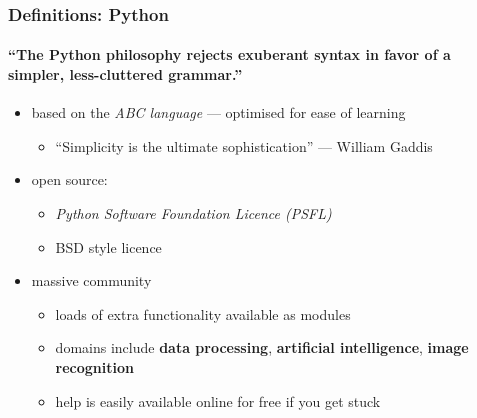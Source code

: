 \documentclass{beamer}
\begin{document}
    \begin{frame}
	    \frametitle{Definitions: Python}
	    \framesubtitle{``The Python philosophy rejects exuberant syntax in favor of a simpler, less-cluttered grammar.''}
	    \begin{itemize}
		    \item based on the \textit{ABC language} --- optimised for ease of learning
			    \begin{itemize}
				    \item ``Simplicity is the ultimate sophistication'' \tiny{--- William Gaddis}
			    \end{itemize}
		    \item open source: 
			    \begin{itemize}
				    \item \textit{Python Software Foundation Licence (PSFL)} 
				    \item BSD style licence
			    \end{itemize}
		    \item massive community
			    \begin{itemize}
				    \item loads of extra functionality available as modules
				    \item domains include \textbf{data processing}, \textbf{artificial intelligence}, \textbf{image recognition}
				    \item help is easily available online for free if you get stuck
			    \end{itemize}
	    \end{itemize}
    \end{frame}

\end{document}
